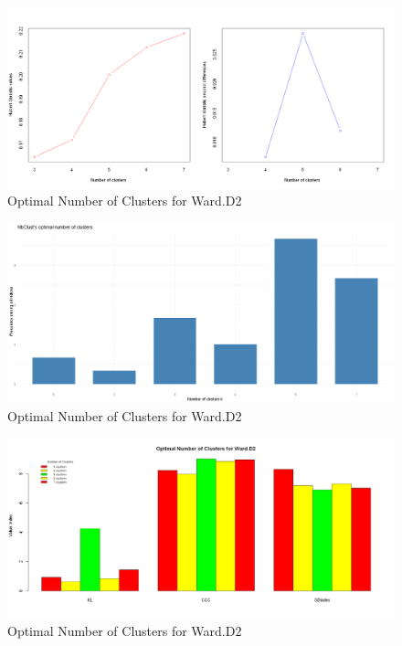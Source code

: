 \documentclass[10pt,twoside]{article}
\numberwithin{equation}{section}
\newcommand{\?}{\stackrel{?}{=}}
\begin{document}
\begin{figure}[h!]
  \centering
  \includegraphics[width=.7\textwidth]{optimal-clusters-ward-d2}
  \caption{Optimal Number of Clusters for Ward.D2}
  \label{fig:optimal-clusters}
\end{figure}

\begin{figure}[h!]
  \centering
  \includegraphics[width=.7\textwidth]{optimal-clusters-wardd2}
  \caption{Optimal Number of Clusters for Ward.D2}
  \label{fig:optimal-clusters-maj}
\end{figure}

\begin{figure}[h!]
  \centering
  \includegraphics[width=.7\textwidth]{optimal-cuts}
  \caption{Optimal Number of Clusters for Ward.D2}
  \label{fig:optimal}
\end{figure}
\end{document}
